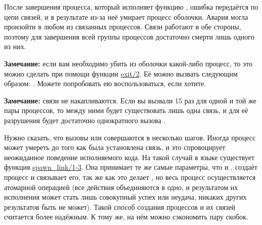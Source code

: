 После завершения процесса, который исполняет функцию , ошибка передаётся по цепи связей, и в результате из\--за неё умирает процесс оболочки.
Авария могла произойти в любом из связанных процессов.
Связи работают в обе стороны, поэтому для завершения всей группы процессов достаточно смерти лишь одного из них.\\
\colorbox{lgray}
{
\begin{minipage}{1.0\linewidth}
    \textbf{Замечание:} если вам необходимо убить из оболочки какой\--либо процесс, то это можно сделать при помощи функции \href{http://erldocs.com/R15B/erts/erlang.html\#exit/2}{exit/2}.
    Её можно вызвать следующим образом: .
    Можете попробовать ею воспользоваться, если хотите.
\end{minipage}
}
\colorbox{lgray}
{
\begin{minipage}{1.0\linewidth}
    \textbf{Замечание:} связи не накапливаются.
    Если вы вызвали  15 раз для одной и той же пары процессов, то между ними будет существовать лишь одна связь, и для её разрушения будет достаточно однократного вызова .
\end{minipage}
}

Нужно сказать, что вызовы  или  совершаются в несколько шагов.
Иногда процесс может умереть до того как была установлена связь, и это спровоцирует неожиданное поведение исполняемого кода.
На такой случай в языке существует функция \href{http://erldocs.com/R15B/erts/erlang.html\#spawn_link/1}{spawn\_link/1-3}.
Она принимает те же самые параметры, что и , создаёт процесс и связывает его, так же как это делает , но весь процесс осуществляется атомарной операцией (все действия объединяются в одно, и результатом их исполнения может стать лишь совокупный успех или неудача, никаких других результатов быть не может).
Такой способ создания процессов и их связей считается более надёжным.
К тому же, на нём можно сэкономить пару скобок.
